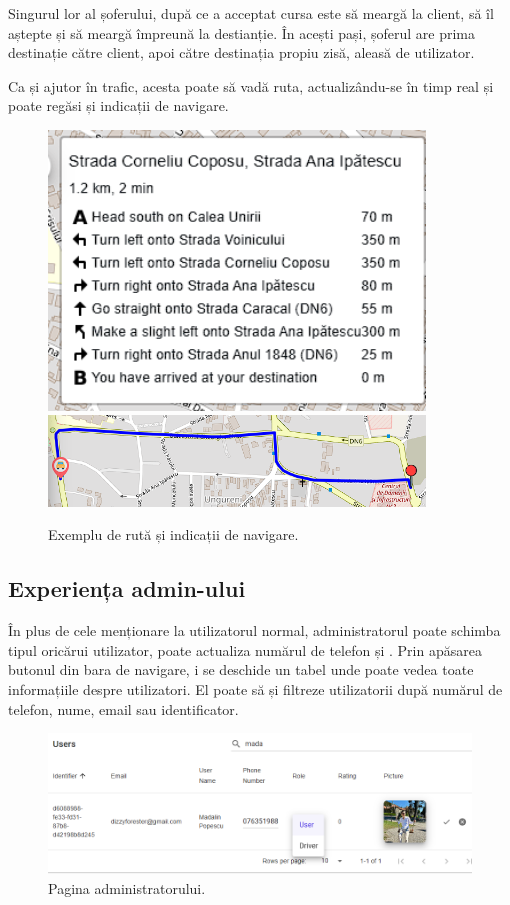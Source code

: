 Singurul lor al șoferului, după ce a acceptat cursa este să meargă la client, să îl aștepte și să
meargă împreună la destianție. În acești pași, șoferul are prima destinație către client, apoi către destinația propiu zisă, aleasă
de utilizator.

Ca și ajutor în trafic, acesta poate să vadă ruta, actualizându-se în timp real și poate regăsi și
indicații de navigare.

\begin{figure}[H]
    \centering
    \includegraphics[width=10cm]{Assets/indicates.png}
    \includegraphics[width=10cm]{Assets/route.png}
    \caption{Exemplu de rută și indicații de navigare.}
    \label{fig:indicates}
\end{figure}

\subsection{Experiența admin-ului}

În plus de cele menționare la utilizatorul normal, administratorul poate schimba tipul 
oricărui utilizator, poate actualiza numărul de telefon și .
Prin apăsarea butonul din bara de navigare, i se deschide un tabel unde poate vedea toate informațiile despre utilizatori.
El poate să și filtreze utilizatorii după numărul de telefon, nume, email sau identificator.
\begin{figure}[H]
    \centering
    \includegraphics[width=16cm]{Assets/adminPage.png}
    \caption{Pagina administratorului.}
    \label{fig:adminPage}
\end{figure}